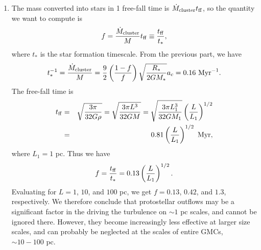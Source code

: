 \begin{enumerate}
\begin{enumerate}
\item The mass converted into stars in 1 free-fall time is $\dot{M}_{\rm cluster} t_{\rm ff}$, so the quantity we want to compute is
\begin{displaymath}
f = \frac{\dot{M}_{\rm cluster}}{M} t_{\rm ff} \equiv \frac{t_{\rm ff}}{t_*},
\end{displaymath}
where $t_*$ is the star formation timescale. From the previous part, we have
\begin{displaymath}
t_*^{-1} = \frac{\dot{M}_{\rm cluster}}{M} =  \frac{9}{2}\left(\frac{1-f}{f}\right) \sqrt{\frac{R_*}{2 G M_*}} a_c = 0.16\mbox{ Myr}^{-1}.
\end{displaymath}
The free-fall time is
\begin{eqnarray*}
t_{\rm ff} & = & \sqrt{\frac{3\pi}{32 G \rho}} = \sqrt{\frac{3\pi L^3}{32 G M}} = \sqrt{\frac{3\pi L_1^3}{32 G M_1}} \left(\frac{L}{L_1}\right)^{1/2} \\
& = & 0.81 \left(\frac{L}{L_1}\right)^{1/2}\mbox{ Myr},
\end{eqnarray*}
where $L_1 = 1$ pc. Thus we have
\begin{displaymath}
f = \frac{t_{\rm ff}}{t_*} = 0.13 \left(\frac{L}{L_1}\right)^{1/2}.
\end{displaymath}
Evaluating for $L = 1$, $10$, and $100$ pc, we get $f = 0.13$, $0.42$, and $1.3$, respectively. We therefore conclude that protostellar outflows may be a significant factor in the driving the turbulence on $\sim 1$ pc scales, and cannot be ignored there. However, they become increasingly less effective at larger size scales, and can probably be neglected at the scales of entire GMCs, $\sim 10-100$ pc.

\end{enumerate}

\begin{enumerate}


\end{enumerate}
\end{enumerate}
